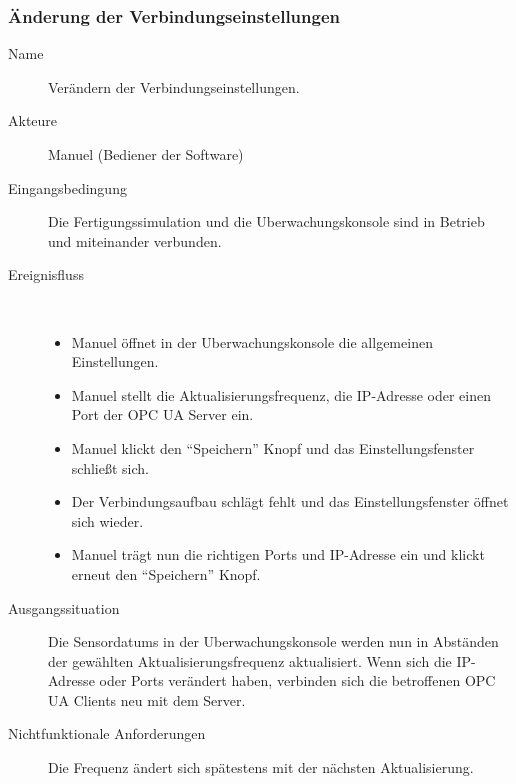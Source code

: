 \documentclass[parskip=full]{scrartcl}
\begin{document}
\subsubsection{Änderung der Verbindungseinstellungen}
\begin{description}
  \item[Name] Verändern der Verbindungseinstellungen.
  \item[Akteure] Manuel (Bediener der Software)
  \item[Eingangsbedingung] Die \gls{Fertigungssimulation} und die \gls{Uberwachungskonsole} sind in Betrieb und miteinander verbunden.
  \item[Ereignisfluss]~\\
  \begin{itemize}[noitemsep]
    \item Manuel öffnet in der \gls{Uberwachungskonsole} die allgemeinen Einstellungen.
    \item Manuel stellt die Aktualisierungsfrequenz, die \gls{IP-Adresse} oder einen Port der \gls{OPC UA Server} ein.
    \item Manuel klickt den "`Speichern"' Knopf und das Einstellungsfenster schließt sich.
    \item Der Verbindungsaufbau schlägt fehlt und das Einstellungsfenster öffnet sich wieder.
    \item Manuel trägt nun die richtigen Ports und \gls{IP-Adresse} ein und klickt erneut den "`Speichern"' Knopf.
  \end{itemize}
  \item[Ausgangssituation] Die \glspl{Sensordatum} in der \gls{Uberwachungskonsole} werden nun in Abständen der gewählten Aktualisierungsfrequenz aktualisiert.
  Wenn sich die \gls{IP-Adresse} oder Ports verändert haben, verbinden sich die betroffenen \glspl{OPC UA Client} neu mit dem Server.
  \item [Nichtfunktionale Anforderungen] Die Frequenz ändert sich spätestens mit der nächsten Aktualisierung.
\end{description}
\end{document}
